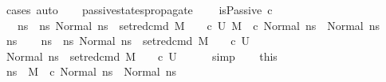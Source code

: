 \begin{isabellebody}
\ {\isacharparenleft}{\kern0pt}cases{\isacharcomma}{\kern0pt}\ auto{\isacharparenright}{\kern0pt}%
\endisatagproof
{\isafoldproof}%
%
\isadelimproof
\isanewline
%
\endisadelimproof
\ \ \isanewline
{}\isamarkupfalse%
\ passive{\isacharunderscore}{\kern0pt}states{\isacharunderscore}{\kern0pt}propagate{\isacharcolon}{\kern0pt}\ \isanewline
\ \ \ {\isachardoublequoteopen}isPassive\ c{\isachardoublequoteclose}\isanewline
\ \ \ {\isachardoublequoteopen}{\isasymforall}ns{\isacharprime}{\kern0pt}\ {\isasymin}\ {\isacharbraceleft}{\kern0pt}ns{\isacharprime}{\kern0pt}{\isachardot}{\kern0pt}\ Normal\ ns{\isacharprime}{\kern0pt}\ {\isasymin}\ {\isacharparenleft}{\kern0pt}set{\isacharunderscore}{\kern0pt}red{\isacharunderscore}{\kern0pt}cmd\ M\ {\isasymLambda}\ {\isasymGamma}\ {\isasymOmega}\ c\ U{\isacharparenright}{\kern0pt}{\isacharbraceright}{\kern0pt}{\isachardot}{\kern0pt}\ M{\isacharcomma}{\kern0pt}{\isasymLambda}{\isacharcomma}{\kern0pt}{\isasymGamma}{\isacharcomma}{\kern0pt}{\isasymOmega}\ {\isasymturnstile}\ {\isasymlangle}c{\isacharcomma}{\kern0pt}\ Normal\ ns{\isacharprime}{\kern0pt}{\isasymrangle}\ {\isasymrightarrow}\ Normal\ ns{\isacharprime}{\kern0pt}{\isachardoublequoteclose}\isanewline
%
\isadelimproof
%
\endisadelimproof
%
\isatagproof
{}\isamarkupfalse%
\isanewline
\ \ \isamarkupfalse%
\ ns{\isacharprime}{\kern0pt}\isanewline
\ \ \isamarkupfalse%
\ {\isachardoublequoteopen}ns{\isacharprime}{\kern0pt}\ {\isasymin}\ {\isacharbraceleft}{\kern0pt}ns{\isacharprime}{\kern0pt}{\isacharprime}{\kern0pt}{\isachardot}{\kern0pt}\ Normal\ ns{\isacharprime}{\kern0pt}{\isacharprime}{\kern0pt}\ {\isasymin}\ {\isacharparenleft}{\kern0pt}set{\isacharunderscore}{\kern0pt}red{\isacharunderscore}{\kern0pt}cmd\ M\ {\isasymLambda}\ {\isasymGamma}\ {\isasymOmega}\ c\ U{\isacharparenright}{\kern0pt}{\isacharbraceright}{\kern0pt}{\isachardoublequoteclose}\isanewline
\ \ \isamarkupfalse%
\ {\isachardoublequoteopen}Normal\ ns{\isacharprime}{\kern0pt}\ {\isasymin}\ {\isacharparenleft}{\kern0pt}set{\isacharunderscore}{\kern0pt}red{\isacharunderscore}{\kern0pt}cmd\ M\ {\isasymLambda}\ {\isasymGamma}\ {\isasymOmega}\ c\ U{\isacharparenright}{\kern0pt}{\isachardoublequoteclose}\isanewline
\ \ \ \ \isamarkupfalse%
\ simp\isanewline
\ \ \isamarkupfalse%
\ this\ \isamarkupfalse%
\ ns\ \ {\isachardoublequoteopen}M{\isacharcomma}{\kern0pt}{\isasymLambda}{\isacharcomma}{\kern0pt}{\isasymGamma}{\isacharcomma}{\kern0pt}{\isasymOmega}\ {\isasymturnstile}\ {\isasymlangle}c{\isacharcomma}{\kern0pt}\ Normal\ ns{\isasymrangle}\ {\isasymrightarrow}\ Normal\ ns{\isacharprime}{\kern0pt}{\isachardoublequoteclose}\isanewline

\end{isabellebody}
